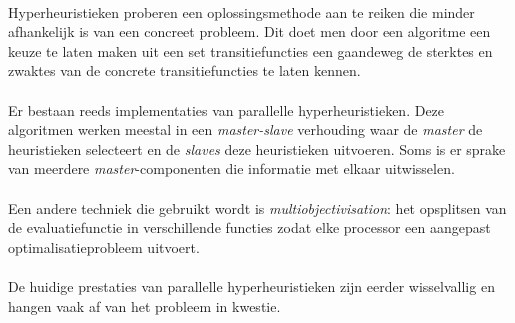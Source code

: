 \paragraph{}
Hyperheuristieken proberen een oplossingsmethode aan te reiken die minder afhankelijk is van een concreet probleem. Dit doet men door een algoritme een keuze te laten maken uit een set transitiefuncties een gaandeweg de sterktes en zwaktes van de concrete transitiefuncties te laten kennen.

\paragraph{}
Er bestaan reeds implementaties van parallelle hyperheuristieken. Deze algoritmen werken meestal in een \emph{master-slave} verhouding waar de \emph{master} de heuristieken selecteert en de \emph{slaves} deze heuristieken uitvoeren. Soms is er sprake van meerdere \emph{master}-componenten die informatie met elkaar uitwisselen.

\paragraph{}
Een andere techniek die gebruikt wordt is \emph{multiobjectivisation}: het opsplitsen van de evaluatiefunctie in verschillende functies zodat elke processor een aangepast optimalisatieprobleem uitvoert.

\paragraph{}
De huidige prestaties van parallelle hyperheuristieken zijn eerder wisselvallig en hangen vaak af van het probleem in kwestie.

